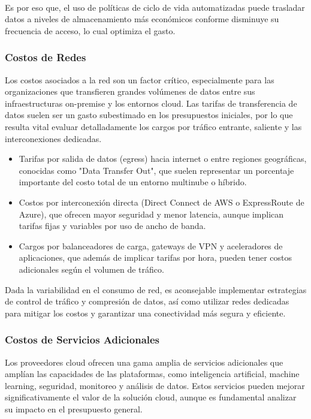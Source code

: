 {                \paragraph{} Es por eso que, el uso de políticas de ciclo de vida automatizadas puede trasladar datos a niveles de almacenamiento más económicos conforme disminuye su frecuencia de acceso, lo cual optimiza el gasto.
                
            \subsubsection{Costos de Redes}
                Los costos asociados a la red son un factor crítico, especialmente para las organizaciones que transfieren grandes volúmenes de datos entre sus infraestructuras on-premise y los entornos cloud. Las tarifas de transferencia de datos suelen ser un gasto subestimado en los presupuestos iniciales, por lo que resulta vital evaluar detalladamente los cargos por tráfico entrante, saliente y las interconexiones dedicadas.
                
                \begin{itemize}
                    \item Tarifas por salida de datos (egress) hacia internet o entre regiones geográficas, conocidas como "Data Transfer Out", que suelen representar un porcentaje importante del costo total de un entorno multinube o híbrido.
                    \item Costos por interconexión directa (Direct Connect de AWS o ExpressRoute de Azure), que ofrecen mayor seguridad y menor latencia, aunque implican tarifas fijas y variables por uso de ancho de banda.
                    \item Cargos por balanceadores de carga, gateways de VPN y aceleradores de aplicaciones, que además de implicar tarifas por hora, pueden tener costos adicionales según el volumen de tráfico.
                \end{itemize}
                
                Dada la variabilidad en el consumo de red, es aconsejable implementar estrategias de control de tráfico y compresión de datos, así como utilizar redes dedicadas para mitigar los costos y garantizar una conectividad más segura y eficiente.
                
            \subsubsection{Costos de Servicios Adicionales}
                Los proveedores cloud ofrecen una gama amplia de servicios adicionales que amplían las capacidades de las plataformas, como inteligencia artificial, machine learning, seguridad, monitoreo y análisis de datos. Estos servicios pueden mejorar significativamente el valor de la solución cloud, aunque es fundamental analizar su impacto en el presupuesto general.
                
}
